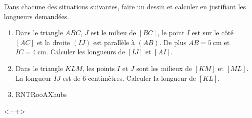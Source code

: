 
\begin{exercice}\label{exosmath-0998}

    Dans chacune des situations suivantes, faire un dessin et calculer en justifiant les longueurs demandées.
    \begin{enumerate}
        \item
            Dans le triangle \( ABC\), \( J\) est le milieu de \( [BC]\), le point \( I\) est sur le côté \( [AC]\) et la droite \( (IJ)\) est parallèle à \( (AB)\). De plus \( AB=\SI{5}{\centi\meter}\) et \( IC=\SI{4}{\centi\meter}\). Calculer les longueurs de \( [IJ]\) et \( [AI]\).
        \item
            Dans le triangle \( KLM\), les points \( I\) et \( J\) sont les milieux de \( [KM]\) et \( [ML]\). La longueur \( IJ\) est de \( 6\) centimètres. Calculer la longueur de \( [KL]\).
        \item
RNTRooAXhubs
    \end{enumerate}
    <++>

\end{exercice}

